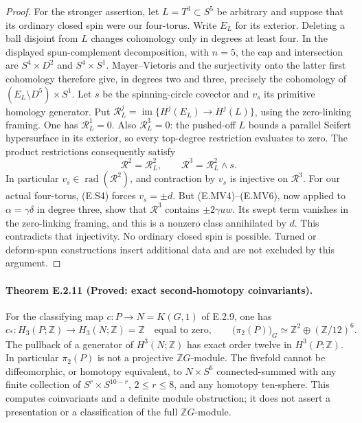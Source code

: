 \begin{proof}
For the stronger assertion, let $L=T^3\subset S^5$ be arbitrary
and suppose that its ordinary closed spin were our four-torus.
Write $E_L$ for its exterior. Deleting a ball disjoint from
$L$ changes cohomology only in degrees at least four. In the
displayed spun-complement decomposition, with $n=5$, the cap
and intersection are $S^4\times D^2$ and $S^4\times S^1$.
Mayer--Vietoris and the surjectivity onto the latter first
cohomology therefore give, in degrees two and three, precisely
the cohomology of $(E_L\setminus D^5)\times S^1$.
Let $s$ be the spinning-circle covector and $v_s$ its primitive
homology generator. Put $\mathcal R_L^j=\operatorname{im}
\{H^j(E_L)\to H^j(L)\}$, using the zero-linking framing.
One has $\mathcal R_L^1=0$. Also $\mathcal R_L^3=0$:
the pushed-off $L$ bounds a parallel Seifert hypersurface in
its exterior, so every top-degree restriction evaluates to
zero. The product restrictions consequently satisfy
\[
       \mathcal R^2=\mathcal R_L^2,\qquad
       \mathcal R^3=\mathcal R_L^2\wedge s.
 \tag{E.S12}
\]
In particular $v_s\in\operatorname{rad}(\mathcal R^2)$,
and contraction by $v_s$ is injective on $\mathcal R^3$.
For our actual four-torus, (E.S4) forces $v_s=\pm d$.
But (E.MV4)--(E.MV6), now applied to $\alpha=\gamma\delta$
in degree three, show that $\mathcal R^3$ contains
$\pm2\gamma uw$. Its swept term vanishes in the zero-linking
framing, and this is a nonzero class annihilated by $d$.
This contradicts that injectivity. No ordinary closed spin
is possible. Turned or deform-spun constructions insert
additional data and are not excluded by this argument.
\end{proof}

\paragraph{Theorem E.2.11 (Proved: exact second-homotopy coinvariants).}
For the classifying map $c:P\to N=K(G,1)$ of E.2.9, one has
\[
 c_*:H_3(P;\mathbb Z)\longrightarrow H_3(N;\mathbb Z)=\mathbb Z
       \quad\text{equal to zero},
 \qquad
 \bigl(\pi_2(P)\bigr)_G
       \simeq\mathbb Z^2\oplus(\mathbb Z/12)^6.
 \tag{E.S6}
\]
The pullback of a generator of $H^3(N;\mathbb Z)$ has exact order
twelve in $H^3(P;\mathbb Z)$. In particular $\pi_2(P)$ is not a
projective $\mathbb ZG$-module. The fivefold cannot be diffeomorphic,
or homotopy equivalent, to $N\times S^6$ connected-summed with any
finite collection of $S^r\times S^{10-r}$, $2\leq r\leq8$, and
any homotopy ten-sphere. This computes coinvariants and a definite
module obstruction; it does not assert a presentation or a
classification of the full $\mathbb ZG$-module.

